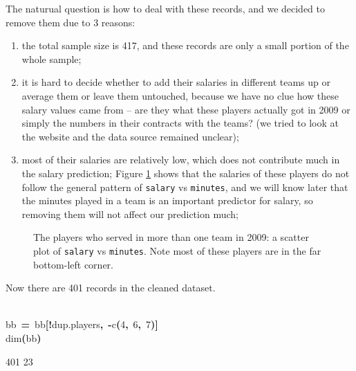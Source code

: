 \documentclass[english]{article}
\newenvironment{dummy}{\par}{\par}
\newcommand{\hlnumber}[1]{\textcolor[rgb]{0.0823529411764706,0.0784313725490196,0.709803921568627}{#1}}%
\newcommand{\hlfunctioncall}[1]{\textcolor[rgb]{1,0,0}{#1}}%
\newcommand{\hlkeyword}[1]{\textcolor[rgb]{0,0,0}{\textbf{#1}}}%
\newcommand{\hlassignement}[1]{\textcolor[rgb]{0.215686274509804,0.215686274509804,0.384313725490196}{\textbf{#1}}}%
\newcommand{\hlsymbol}[1]{\textcolor[rgb]{0,0,0}{#1}}%
\newcommand{\hlprompt}[1]{\textcolor[rgb]{0,0,0}{#1}}%
\newcommand{\hlstd}[1]{\textcolor[rgb]{0,0,0}{#1}}%
\begin{document}
The naturual question is how to deal with these records, and we decided
to remove them due to 3 reasons:
\begin{enumerate}
\item the total sample size is 417, and these records are only a small portion
of the whole sample;
\item it is hard to decide whether to add their salaries in different teams
up or average them or leave them untouched, because we have no clue
how these salary values came from -- are they what these players actually
got in 2009 or simply the numbers in their contracts with the teams?
(we tried to look at the website and the data source remained unclear);
\item most of their salaries are relatively low, which does not contribute
much in the salary prediction; Figure \ref{fig:duplicate-plot} shows
that the salaries of these players do not follow the general pattern
of \texttt{salary} vs \texttt{minutes}, and we will know later that
the minutes played in a team is an important predictor for salary,
so removing them will not affect our prediction much;
\end{enumerate}
%
\begin{figure}
\begin{dummy}

\begin{center}


\endpgfgraphicnamed
\end{center}
\end{dummy}
\caption{The players who served in more than one team in 2009: a scatter plot
of \texttt{salary} vs \texttt{minutes}. Note most of these players
are in the far bottom-left corner.\label{fig:duplicate-plot}}

\end{figure}


Now there are 401 records in the cleaned dataset.
\begin{dummy}
\hspace*{\fill}\\
\hlstd{}\ttfamily\noindent
\hlprompt{\usebox{\hlnormalsizeboxgreaterthan}{\ }}\hlsymbol{bb}{\ }\hlassignement{=}{\ }\hlsymbol{bb}\hlkeyword{[}\hlkeyword{!}\hlsymbol{dup.players}\hlkeyword{,}{\ }\hlkeyword{-}\hlfunctioncall{c}\hlkeyword{(}\hlnumber{4}\hlkeyword{,}{\ }\hlnumber{6}\hlkeyword{,}{\ }\hlnumber{7}\hlkeyword{)}\hlkeyword{]}\mbox{}
\normalfont
\hspace*{\fill}\\
\hlstd{}\ttfamily\noindent
\hlprompt{\usebox{\hlnormalsizeboxgreaterthan}{\ }}\hlfunctioncall{dim}\hlkeyword{(}\hlsymbol{bb}\hlkeyword{)}\mbox{}
\normalfont
\hspace*{\fill}\\
\hlstd{}\begin{Schunk}
\begin{Soutput}
[1] 401  23
\end{Soutput}

\end{Schunk}
\end{dummy}
\end{document}

